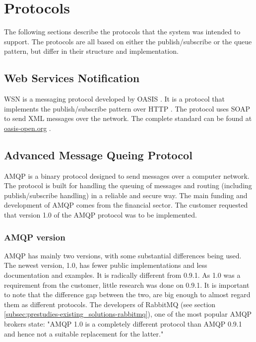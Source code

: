 \section{Protocols}
\label{prestudies-protocols}

The following sections describe the protocols that the system was intended to support. The protocols are all based on either the publish/subscribe or the queue pattern, but differ in their structure and implementation.

\subsection{Web Services Notification}
\label{subsec:prestudies-wsnotification}

WSN is a messaging protocol developed by OASIS \cite{oasis}. It is a protocol that implements the publish/subscribe pattern over HTTP \cite{http}. The protocol uses SOAP \cite{soap} to send XML \cite{xml} messages over the network. The complete standard can be found at \url{oasis-open.org} \cite{wsn-basenotification}.

\subsection{Advanced Message Queing Protocol}
\label{subsec:prestudies-amqp}
AMQP is a binary protocol designed to send messages over a computer network. The protocol is built for handling the queuing of messages and routing (including publish/subscribe handling) in a reliable and secure way. The main funding and development of AMQP comes from the financial sector. The customer requested that version 1.0 of the AMQP protocol was to be implemented.

\subsubsection{AMQP version}
\label{subsec:prestudies-amqp-amqp_version}
AMQP has mainly two versions, with some substantial differences being used. The newest version, 1.0, has fewer public implementations and less documentation and examples. It is radically different from 0.9.1. As 1.0 was a requirement from the customer, little research was done on 0.9.1. It is important to note that the difference gap between the two, are big enough to almost regard them as different protocols. The developers of RabbitMQ (see section \ref{subsec:prestudies-existing_solutions-rabbitmq}), one of the most popular AMQP brokers state: "AMQP 1.0 is a completely different protocol than AMQP 0.9.1 and hence not a suitable replacement for the latter."

